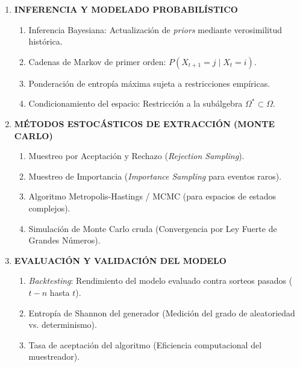 \documentclass[11pt,a4paper]{article}
\begin{document}
\begin{enumerate}[label=\textbf{\arabic*.}]
    \item \textbf{INFERENCIA Y MODELADO PROBABILÍSTICO}
    \begin{enumerate}[label=\textbf{4.\arabic*}]
        \item Inferencia Bayesiana: Actualización de \textit{priors} mediante verosimilitud histórica.
        \item Cadenas de Markov de primer orden: $P(X_{t+1} = j \mid X_t = i)$.
        \item Ponderación de entropía máxima sujeta a restricciones empíricas.
        \item Condicionamiento del espacio: Restricción a la subálgebra $\Omega^* \subset \Omega$.
    \end{enumerate}

    \item \textbf{MÉTODOS ESTOCÁSTICOS DE EXTRACCIÓN (MONTE CARLO)}
    \begin{enumerate}[label=\textbf{5.\arabic*}]
        \item Muestreo por Aceptación y Rechazo (\textit{Rejection Sampling}).
        \item Muestreo de Importancia (\textit{Importance Sampling} para eventos raros).
        \item Algoritmo Metropolis-Hastings / MCMC (para espacios de estados complejos).
        \item Simulación de Monte Carlo cruda (Convergencia por Ley Fuerte de Grandes Números).
    \end{enumerate}

    \item \textbf{EVALUACIÓN Y VALIDACIÓN DEL MODELO}
    \begin{enumerate}[label=\textbf{6.\arabic*}]
        \item \textit{Backtesting}: Rendimiento del modelo evaluado contra sorteos pasados ($t-n$ hasta $t$).
        \item Entropía de Shannon del generador (Medición del grado de aleatoriedad vs. determinismo).
        \item Tasa de aceptación del algoritmo (Eficiencia computacional del muestreador).
    \end{enumerate}
\end{enumerate}
\end{document}
